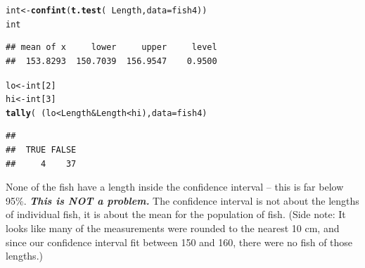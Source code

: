 \documentclass[twoside]{book}\usepackage[]{graphicx}\usepackage[]{xcolor}
\makeatletter
\newcommand{\hlnum}[1]{\textcolor[rgb]{0.686,0.059,0.569}{#1}}%
\newcommand{\hlopt}[1]{\textcolor[rgb]{0,0,0}{#1}}%
\newcommand{\hlstd}[1]{\textcolor[rgb]{0.345,0.345,0.345}{#1}}%
\newcommand{\hlkwb}[1]{\textcolor[rgb]{0.69,0.353,0.396}{#1}}%
\newcommand{\hlkwc}[1]{\textcolor[rgb]{0.333,0.667,0.333}{#1}}%
\newcommand{\hlkwd}[1]{\textcolor[rgb]{0.737,0.353,0.396}{\textbf{#1}}}%
\newenvironment{kframe}{%
 \def\at@end@of@kframe{}%
 \ifinner\ifhmode%
  \def\at@end@of@kframe{\end{minipage}}%
  \begin{minipage}{\columnwidth}%
 \fi\fi%
 \def\FrameCommand##1{\hskip\@totalleftmargin \hskip-\fboxsep
 \colorbox{shadecolor}{##1}\hskip-\fboxsep
     \hskip-\linewidth \hskip-\@totalleftmargin \hskip\columnwidth}%
 \MakeFramed {\advance\hsize-\width
   \@totalleftmargin\z@ \linewidth\hsize
   \@setminipage}}%
 {\par\unskip\endMakeFramed%
 \at@end@of@kframe}
\newenvironment{knitrout}{}{} %
\makeatother
\begin{document}
\begin{solution}
\begin{enumerate}
\begin{knitrout}
{}



\end{knitrout}
\begin{knitrout}
\color{fgcolor}\begin{kframe}
\begin{alltt}
\hlstd{int} \hlkwb{<-} \hlkwd{confint}\hlstd{(}\hlkwd{t.test}\hlstd{(} \hlopt{~}\hlstd{Length,} \hlkwc{data}\hlstd{=fish4))}
\hlstd{int}
\end{alltt}
\begin{verbatim}
## mean of x     lower     upper     level 
##  153.8293  150.7039  156.9547    0.9500
\end{verbatim}
\begin{alltt}
\hlstd{lo} \hlkwb{<-} \hlstd{int[}\hlnum{2}\hlstd{]}
\hlstd{hi} \hlkwb{<-} \hlstd{int[}\hlnum{3}\hlstd{]}
\hlkwd{tally} \hlstd{(} \hlopt{~} \hlstd{( lo} \hlopt{<} \hlstd{Length} \hlopt{&} \hlstd{Length} \hlopt{<} \hlstd{hi ),} \hlkwc{data}\hlstd{=fish4 )}
\end{alltt}
\begin{verbatim}
## 
##  TRUE FALSE 
##     4    37
\end{verbatim}
\end{kframe}
\end{knitrout}
None of the fish have a length inside the confidence interval -- this is far below 95\%.  
\textbf{\emph{This is NOT a problem.}}
The confidence interval is not about the lengths of individual fish, it is about 
the mean for the population of fish.  (Side note: It looks like many of the measurements
were rounded to the nearest 10 cm, and since our confidence interval fit between 150 and 160,
there were no fish of those lengths.)


\end{enumerate}
\end{solution}
\end{document}
